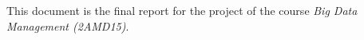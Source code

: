 This document is the final report for the project of the course \emph{Big Data Management (2AMD15)}.


